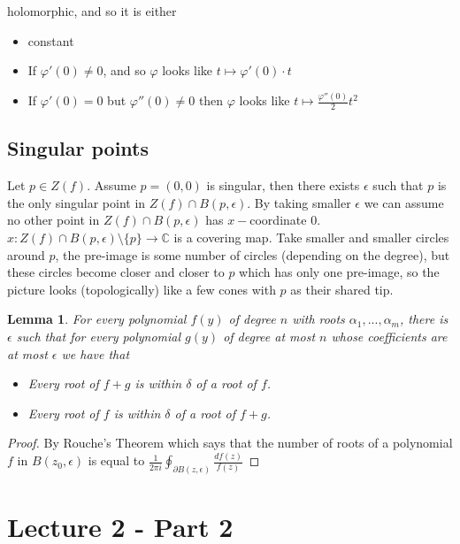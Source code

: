 \documentclass[12pt]{article}
\newtheorem{lemma}[theorem]{Lemma}
\theoremstyle{remark}
\newcommand{\C}{\mathbb{C}}
\begin{document}
holomorphic, and so it is either
\begin{itemize}
\item  constant
\item If $\varphi '(0) \neq 0$, and so $\varphi$ looks like $t \mapsto \varphi '(0) \cdot t$
\item If $\varphi'(0) =0$ but $\varphi''(0) \neq 0$ then $\varphi$ looks like $t \mapsto \frac{\varphi''(0)}{2} t^2$
\end{itemize}

\subsection{Singular points}

Let $p \in Z(f)$. Assume $p = (0,0)$ is singular, then there exists $\epsilon$ such that $p$ is the only singular point in $Z(f) \cap B(p, \epsilon)$. By taking smaller $\epsilon$ we can assume no other point in $Z(f) \cap B(p, \epsilon)$ has $x-$coordinate $0$.\\

$x: Z(f) \cap B(p,\epsilon) \setminus \{ p \} \rightarrow \C$ is a covering map. Take smaller and smaller circles around $p$, the pre-image is some number of circles (depending on the degree), but these circles become closer and closer to $p$ which has only one pre-image, so the picture looks (topologically) like a few cones with $p$ as their shared tip.

\begin{lemma}
For every polynomial $f(y)$ of degree $n$ with roots $\alpha_1,...,\alpha_m$, there is $\epsilon$ such that for every polynomial $g(y)$ of degree at most $n$ whose coefficients are at most $\epsilon$ we have that 
\begin{itemize}
\item Every root of $f+g$ is within $\delta$ of a root of $f$.
\item Every root of $f$ is within $\delta$ of a root of $f+g$.
\end{itemize}
\end{lemma}

\begin{proof}
By Rouche's Theorem which says that the number of roots of a polynomial $f$ in $B(z_0, \epsilon)$ is equal to $ \frac{1}{2 \pi i } \oint_{\partial B(z, \epsilon)} \frac{d f(z)}{f(z)}$
\end{proof}


\section{Lecture 2 - Part 2}
\end{document}
